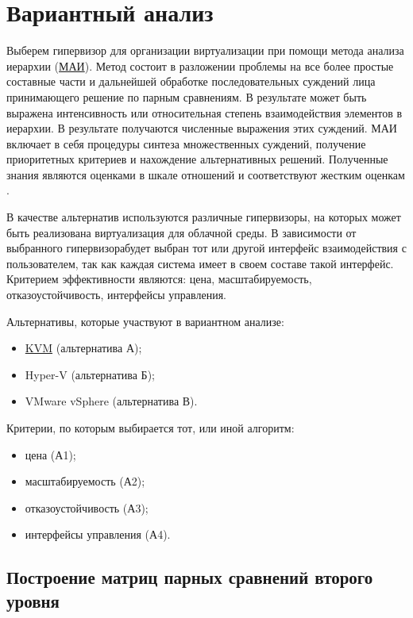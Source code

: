 \section{Вариантный анализ}

Выберем гипервизор для организации виртуализации при помощи метода анализа иерархии (\hyperlink{mai}{МАИ}).
Метод состоит в разложении проблемы на все более простые составные части и дальнейшей обработке последовательных суждений лица принимающего решение по парным сравнениям.
В результате может быть выражена интенсивность или относительная степень взаимодействия элементов в иерархии.
В результате получаются численные выражения этих суждений.
МАИ включает в себя процедуры синтеза множественных суждений, получение приоритетных критериев и нахождение альтернативных решений.
Полученные знания являются оценками в шкале отношений и соответствуют жестким оценкам \cite{var-analyz}.

В качестве альтернатив используются различные гипервизоры, на которых может быть реализована виртуализация для облачной среды.
В зависимости от выбранного гипервизорабудет выбран тот или другой интерфейс взаимодействия с пользователем, так как каждая система имеет в своем составе такой интерфейс.
Критерием эффективности являются: цена, масштабируемость, отказоустойчивость, интерфейсы управления.

Альтернативы, которые участвуют в вариантном анализе:
\begin{itemize}
  \item \hyperlink{kvm}{KVM} (альтернатива А);
  \item Hyper-V (альтернатива Б);
  \item VMware vSphere (альтернатива В).
\end{itemize}

Критерии, по которым выбирается тот, или иной алгоритм:
\begin{itemize}
  \item цена (А1);
  \item масштабируемость (А2);
  \item отказоустойчивость (А3);
  \item интерфейсы управления (А4).
\end{itemize}

\subsection{Построение матриц парных сравнений второго уровня}

